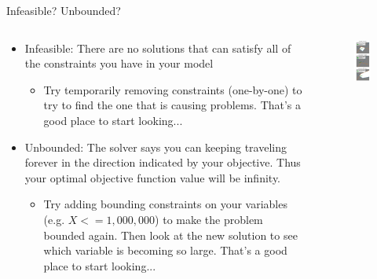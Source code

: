 \documentclass[10pt, aspectratio=169]{beamer}
\begin{document}
\begin{frame}{Infeasible? Unbounded?}
    \begin{columns}
        \begin{column}{0.5\textwidth}
            \begin{itemize}
                \item Infeasible: There are no solutions that can satisfy all of the constraints you have in your model
                \begin{itemize}
                    \item Try temporarily removing constraints (one-by-one) to try to find the one that is causing problems. That's a good place to start looking...
                \end{itemize}
                \item Unbounded: The solver says you can keeping traveling forever in the direction indicated by your objective. Thus your optimal objective function value will be infinity.
                \begin{itemize}
                    \item Try adding bounding constraints on your variables (e.g. $X <= 1,000,000$) to make the problem bounded again. Then look at the new solution to see which variable is becoming so large. That's a good place to start looking...
                \end{itemize}
            \end{itemize}
        \end{column}
        \begin{column}{0.5 \textwidth}
            \vspace{-0.5cm}
            \begin{figure}
                \includegraphics[width=0.4\linewidth]{InfeasibleUnbounded.png}
            \end{figure}
        \end{column}
    \end{columns}

\end{frame}
\end{document}
